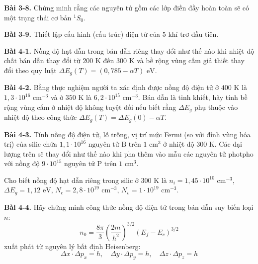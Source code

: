 \expandafter\def\csname debai@3-8\endcsname{
\textbf{Bài 3-8.} Chứng minh rằng các nguyên tử gồm các lớp điền đầy hoàn toàn sẽ có một trạng thái cơ bản $^1S_0$.
}

\expandafter\def\csname debai@3-9\endcsname{
\textbf{Bài 3-9.} Thiết lập cấu hình (cấu trúc) điện tử của 5 khí trơ đầu tiên.
}

\expandafter\def\csname debai@4-1\endcsname{
\textbf{Bài 4-1.} Nồng độ hạt dẫn trong bán dẫn riêng thay đổi như thế nào khi nhiệt độ chất bán dẫn thay đổi từ $200\text{ K}$ đến $300\text{ K}$ và bề rộng vùng cấm giả thiết thay đổi theo quy luật $\Delta E_g(T) = (0{,}785 - \alpha T)\text{ eV}$.
}

\expandafter\def\csname debai@4-2\endcsname{
\textbf{Bài 4-2.} Bằng thực nghiệm người ta xác định được nồng độ điện tử ở $400\text{ K}$ là $1{,}3 \cdot 10^{16}\text{ cm}^{-3}$ và ở $350\text{ K}$ là $6{,}2 \cdot 10^{15}\text{ cm}^{-3}$. Bán dẫn là tinh khiết, hãy tính bề rộng vùng cấm ở nhiệt độ không tuyệt đối nếu biết rằng $\Delta E_g$ phụ thuộc vào nhiệt độ theo công thức $\Delta E_g(T) = \Delta E_g(0) - \alpha T$.
}

\expandafter\def\csname debai@4-3\endcsname{
\textbf{Bài 4-3.} Tính nồng độ điện tử, lỗ trống, vị trí mức Fermi (so với đỉnh vùng hóa trị) của silic chứa $1{,}1 \cdot 10^{16}\text{ nguyên tử B trên } 1\text{ cm}^3$ ở nhiệt độ $300\text{ K}$. Các đại lượng trên sẽ thay đổi như thế nào khi pha thêm vào mẫu các nguyên tử photpho với nồng độ $9 \cdot 10^{15}\text{ nguyên tử P trên } 1\text{ cm}^3$.

Cho biết nồng độ hạt dẫn riêng trong silic ở $300\text{ K}$ là $n_i = 1{,}45 \cdot 10^{10}\text{ cm}^{-3}$, $\Delta E_g = 1{,}12\text{ eV}$, $N_c = 2{,}8 \cdot 10^{19}\text{ cm}^{-3}$, $N_v = 1 \cdot 10^{19}\text{ cm}^{-3}$.
}

\expandafter\def\csname debai@4-4\endcsname{
\textbf{Bài 4-4.} Hãy chứng minh công thức nồng độ điện tử trong bán dẫn suy biến loại $n$:
\begin{equation*}
    n_0 = \frac{8\pi}{3}\left(\frac{2m}{h^2}\right)^{3/2}(E_f - E_c)^{3/2}
\end{equation*}
xuất phát từ nguyên lý bất định Heisenberg:
\begin{equation*}
    \Delta x \cdot \Delta p_x = h, \quad \Delta y \cdot \Delta p_y = h, \quad \Delta z \cdot \Delta p_z = h
\end{equation*}
}

